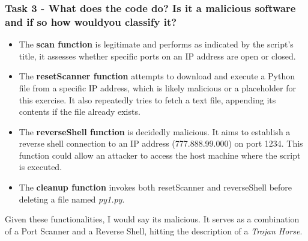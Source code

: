 \subsubsection{Task 3 - What does the code do? Is it a malicious software and if so how wouldyou classify it?}
\begin{itemize}
      \item The \textbf{scan function} is legitimate and performs as indicated by the script's title, it assesses whether specific ports on an IP address are open or closed.

      \item The \textbf{resetScanner function} attempts to download and execute a Python file from a specific IP address, which is likely malicious or a placeholder for this exercise. It also repeatedly tries to fetch a text file, appending its contents if the file already exists.

      \item The \textbf{reverseShell function} is decidedly malicious. It aims to establish a reverse shell connection to an IP address (777.888.99.000) on port 1234. This function could allow an attacker to access the host machine where the script is executed.

      \item The \textbf{cleanup function} invokes both resetScanner and reverseShell before deleting a file named \textit{py1.py}.
\end{itemize}

Given these functionalities, I would say its malicious. It serves as a combination of a Port Scanner and a Reverse Shell, hitting the description of a \textit{Trojan Horse}.


